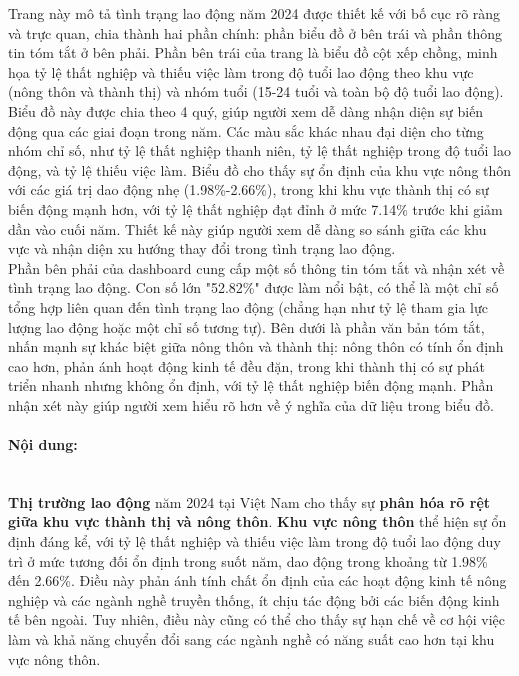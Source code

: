 \documentclass[a4paper]{report}
\begin{document}
{{Trang này mô tả tình trạng lao động năm 2024 được thiết kế với bố cục rõ ràng và trực quan, chia thành hai phần chính: phần biểu đồ ở bên trái và phần thông tin tóm tắt ở bên phải. Phần bên trái của trang là biểu đồ cột xếp chồng, minh họa tỷ lệ thất nghiệp và thiếu việc làm trong độ tuổi lao động theo khu vực (nông thôn và thành thị) và nhóm tuổi (15-24 tuổi và toàn bộ độ tuổi lao động). Biểu đồ này được chia theo 4 quý, giúp người xem dễ dàng nhận diện sự biến động qua các giai đoạn trong năm. Các màu sắc khác nhau đại diện cho từng nhóm chỉ số, như tỷ lệ thất nghiệp thanh niên, tỷ lệ thất nghiệp trong độ tuổi lao động, và tỷ lệ thiếu việc làm. Biểu đồ cho thấy sự ổn định của khu vực nông thôn với các giá trị dao động nhẹ (1.98\%-2.66\%), trong khi khu vực thành thị có sự biến động mạnh hơn, với tỷ lệ thất nghiệp đạt đỉnh ở mức 7.14\% trước khi giảm dần vào cuối năm. Thiết kế này giúp người xem dễ dàng so sánh giữa các khu vực và nhận diện xu hướng thay đổi trong tình trạng lao động.\\

Phần bên phải của dashboard cung cấp một số thông tin tóm tắt và nhận xét về tình trạng lao động. Con số lớn "52.82\%" được làm nổi bật, có thể là một chỉ số tổng hợp liên quan đến tình trạng lao động (chẳng hạn như tỷ lệ tham gia lực lượng lao động hoặc một chỉ số tương tự). Bên dưới là phần văn bản tóm tắt, nhấn mạnh sự khác biệt giữa nông thôn và thành thị: nông thôn có tính ổn định cao hơn, phản ánh hoạt động kinh tế đều đặn, trong khi thành thị có sự phát triển nhanh nhưng không ổn định, với tỷ lệ thất nghiệp biến động mạnh. Phần nhận xét này giúp người xem hiểu rõ hơn về ý nghĩa của dữ liệu trong biểu đồ.

\paragraph{Nội dung: } \mbox{}\\

\textbf{Thị trường lao động} năm 2024 tại Việt Nam cho thấy sự \textbf{phân hóa rõ rệt giữa khu vực thành thị và nông thôn}. \textbf{Khu vực nông thôn} thể hiện sự ổn định đáng kể, với tỷ lệ thất nghiệp và thiếu việc làm trong độ tuổi lao động duy trì ở mức tương đối ổn định trong suốt năm, dao động trong khoảng từ 1.98\% đến 2.66\%. Điều này phản ánh tính chất ổn định của các hoạt động kinh tế nông nghiệp và các ngành nghề truyền thống, ít chịu tác động bởi các biến động kinh tế bên ngoài. Tuy nhiên, điều này cũng có thể cho thấy sự hạn chế về cơ hội việc làm và khả năng chuyển đổi sang các ngành nghề có năng suất cao hơn tại khu vực nông thôn.\\

}}
\end{document}
